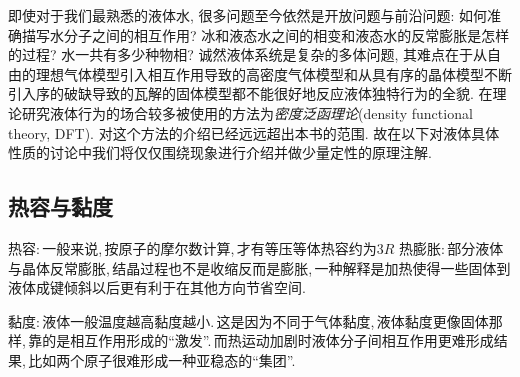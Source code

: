 即使对于我们最熟悉的液体水, 很多问题至今依然是开放问题与前沿问题: 如何准确描写水分子之间的相互作用? 冰和液态水之间的相变和液态水的反常膨胀是怎样的过程? 水一共有多少种物相? 诚然液体系统是复杂的多体问题, 其难点在于从自由的理想气体模型引入相互作用导致的高密度气体模型和从具有序的晶体模型不断引入序的破缺导致的瓦解的固体模型都不能很好地反应液体独特行为的全貌. 在理论研究液体行为的场合较多被使用的方法为\emph{密度泛函理论}(density functional theory, DFT). 对这个方法的介绍已经远远超出本书的范围. 故在以下对液体具体性质的讨论中我们将仅仅围绕现象进行介绍并做少量定性的原理注解.


\subsection{热容与黏度}
热容:\,一般来说,\,按原子的摩尔数计算,\,才有等压等体热容约为$3R$
热膨胀:\,部分液体与晶体反常膨胀,\,结晶过程也不是收缩反而是膨胀,\,一种解释是加热使得一些固体到液体成键倾斜以后更有利于在其他方向节省空间.

黏度:\,液体一般温度越高黏度越小.\,这是因为不同于气体黏度,\,液体黏度更像固体那样,\,靠的是相互作用形成的``激发''.\,而热运动加剧时液体分子间相互作用更难形成结果,\,比如两个原子很难形成一种亚稳态的``集团''.





